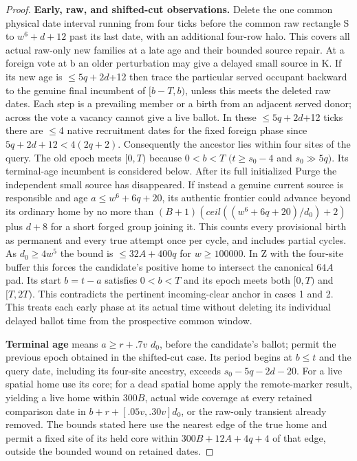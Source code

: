 \begin{proof}
\textbf{Early, raw, and shifted-cut observations.} Delete the one common physical date interval running from four ticks before the common raw rectangle S to \(w^6+d+12\) past its last date, with an additional four-row halo. This covers all actual raw-only new families at a late age and their bounded source repair. At a foreign vote at b an older perturbation may give a delayed small source in K. If its new age is \(\le\)\(5q+2d\)+12 then trace the particular served occupant backward to the genuine final incumbent of \([b- T,b)\), unless this meets the deleted raw dates. Each step is a prevailing member or a birth from an adjacent served donor; across the vote a vacancy cannot give a live ballot. In these \(\le\)\(5q+2d\)+12 ticks there are \(\le\)4 native recruitment dates for the fixed foreign phase since \(5q+2d+12<4(2q+2)\). Consequently the ancestor lies within four sites of the query. The old epoch meets \([0,T)\) because \(0<b<T\) \((t\ge s_0- 4\) and \(s_0\)\(\gg\)\(5q)\). Its terminal-age incumbent is considered below. After its full initialized Purge the independent small source has disappeared. If instead a genuine current source is responsible and age \(a\le w^6+6q+20\), its authentic frontier could advance beyond its ordinary home by no more than \((B+1)(ceil((w^6+6q+20)/d_0)+2)\) plus \(d+8\) for a short forged group joining it. This counts every provisional birth as permanent and every true attempt once per cycle, and includes partial cycles. As \(d_0\ge 4w^5\) the bound is \(\le\)\(32A+400q\) for \(w\ge 100000\). In Z with the four-site buffer this forces the candidate's positive home to intersect the canonical \(64A\) pad. Its start \(b=t-a\) satisfies \(0<b<T\) and its epoch meets both \([0,T)\) and \([T,2T)\). This contradicts the pertinent incoming-clear anchor in cases 1 and 2. This treats each early phase at its actual time without deleting its individual delayed ballot time from the prospective common window.

\textbf{Terminal age} means \(a\ge r+.7v\) \(d_0\), before the candidate's ballot; permit the previous epoch obtained in the shifted-cut case. Its period begins at \(b\le t\) and the query date, including its four-site ancestry, exceeds \(s_0- 5q- 2d- 20\). For a live spatial home use its core; for a dead spatial home apply the remote-marker result, yielding a live home within \(300B\), actual wide coverage at every retained comparison date in \(b+r+[.05v,.30v]d_0\), or the raw-only transient already removed. The bounds stated here use the nearest edge of the true home and permit a fixed site of its held core within \(300B+12A+4q+4\) of that edge, outside the bounded wound on retained dates.


\end{proof}
